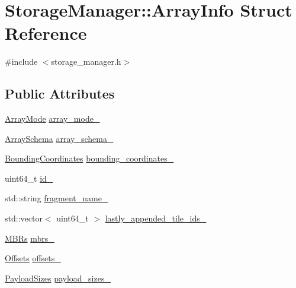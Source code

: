 \hypertarget{structStorageManager_1_1ArrayInfo}{}\section{Storage\+Manager\+:\+:Array\+Info Struct Reference}
\label{structStorageManager_1_1ArrayInfo}


{\ttfamily \#include $<$storage\+\_\+manager.\+h$>$}

\subsection*{Public Attributes}
\begin{DoxyCompactItemize}
\item 
\hyperlink{classStorageManager_a283b60c689883bc7c343ffbf1de8fc3d}{Array\+Mode} \hyperlink{structStorageManager_1_1ArrayInfo_a6563b5e958b9abf0971dd6efa82ff330}{array\+\_\+mode\+\_\+}
\item 
\hyperlink{classArraySchema}{Array\+Schema} \hyperlink{structStorageManager_1_1ArrayInfo_a493f3c1795042afdaecc997ab6878cb8}{array\+\_\+schema\+\_\+}
\item 
\hyperlink{classStorageManager_ab527f4f911acfefc5c92ecaddec41300}{Bounding\+Coordinates} \hyperlink{structStorageManager_1_1ArrayInfo_a1826af77bebd82f8f6996633893016ae}{bounding\+\_\+coordinates\+\_\+}
\item 
uint64\+\_\+t \hyperlink{structStorageManager_1_1ArrayInfo_a03f7d3a19af3b09d8ea5577b1605639f}{id\+\_\+}
\item 
std\+::string \hyperlink{structStorageManager_1_1ArrayInfo_a48f16de429210120242a73cc1bd79e6d}{fragment\+\_\+name\+\_\+}
\item 
std\+::vector$<$ uint64\+\_\+t $>$ \hyperlink{structStorageManager_1_1ArrayInfo_ad8a93fcfecfefc7a9d784f2474cc8683}{lastly\+\_\+appended\+\_\+tile\+\_\+ids\+\_\+}
\item 
\hyperlink{classStorageManager_a09f09fbac76952a268f77ac049da4070}{M\+B\+Rs} \hyperlink{structStorageManager_1_1ArrayInfo_a86031a1485d05c1eb6b83dfcfe376fbe}{mbrs\+\_\+}
\item 
\hyperlink{classStorageManager_a92535a9b1da2da9098d241c0ea6e1bea}{Offsets} \hyperlink{structStorageManager_1_1ArrayInfo_a827acecebaa566e97f0954fc59cb9fe0}{offsets\+\_\+}
\item 
\hyperlink{classStorageManager_aa9bfc155a79c21a94d554f576c2976ca}{Payload\+Sizes} \hyperlink{structStorageManager_1_1ArrayInfo_a499762205edde51a24aa6229ba17aa44}{payload\+\_\+sizes\+\_\+}

\end{DoxyCompactItemize}
